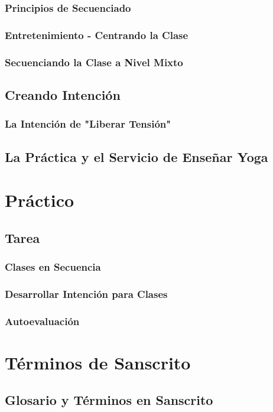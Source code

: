 \documentclass[a4paper]{article}
\begin{document}
\subsubsection{Principios de Secuenciado}
\subsubsection{Entretenimiento - Centrando la Clase}
\subsubsection{Secuenciando la Clase a Nivel Mixto}
\subsection{Creando Intención}
\subsubsection{La Intención de "Liberar Tensión"}
\subsection{La Práctica y el Servicio de Enseñar Yoga}

\section{Práctico}
\subsection{Tarea}
\subsubsection{Clases en Secuencia}
\subsubsection{Desarrollar Intención para Clases}
\subsubsection{Autoevaluación}

\section{Términos de Sanscrito}
\subsection{Glosario y Términos en Sanscrito}
\end{document}
